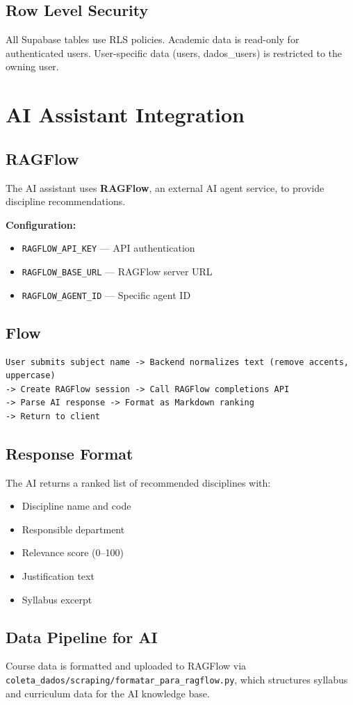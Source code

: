 \documentclass[11pt,a4paper]{article}
\newcommand{\code}[1]{\texttt{#1}}
\begin{document}
\subsection{Row Level Security}

All Supabase tables use RLS policies. Academic data is read-only for authenticated
users. User-specific data (users, dados\_users) is restricted to the owning user.

\section{AI Assistant Integration}

\subsection{RAGFlow}

The AI assistant uses \textbf{RAGFlow}, an external AI agent service, to provide
discipline recommendations.

\noindent\textbf{Configuration:}
\begin{itemize}[noitemsep]
    \item \code{RAGFLOW\_API\_KEY} — API authentication
    \item \code{RAGFLOW\_BASE\_URL} — RAGFlow server URL
    \item \code{RAGFLOW\_AGENT\_ID} — Specific agent ID
\end{itemize}

\subsection{Flow}
\begin{lstlisting}
User submits subject name -> Backend normalizes text (remove accents, uppercase)
-> Create RAGFlow session -> Call RAGFlow completions API
-> Parse AI response -> Format as Markdown ranking
-> Return to client
\end{lstlisting}

\subsection{Response Format}

The AI returns a ranked list of recommended disciplines with:
\begin{itemize}[noitemsep]
    \item Discipline name and code
    \item Responsible department
    \item Relevance score (0--100)
    \item Justification text
    \item Syllabus excerpt
\end{itemize}

\subsection{Data Pipeline for AI}

Course data is formatted and uploaded to RAGFlow via
\code{coleta\_dados/scraping/formatar\_para\_ragflow.py}, which structures syllabus
and curriculum data for the AI knowledge base.
\end{document}
